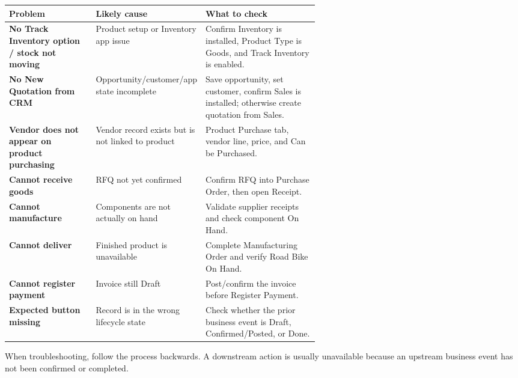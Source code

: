 \begin{erptable}
\begin{tabularx}{\linewidth}{@{}>{\bfseries\color{ERPRed}}p{0.29\linewidth}p{0.31\linewidth}X@{}}
\toprule
\rowcolor{ERPPaleRed!70}
Problem & Likely cause & What to check \\
\midrule
No Track Inventory option / stock not moving & Product setup or Inventory app issue & Confirm Inventory is installed, Product Type is Goods, and Track Inventory is enabled. \\
No New Quotation from CRM & Opportunity/customer/app state incomplete & Save opportunity, set customer, confirm Sales is installed; otherwise create quotation from Sales. \\
Vendor does not appear on product purchasing & Vendor record exists but is not linked to product & Product Purchase tab, vendor line, price, and Can be Purchased. \\
Cannot receive goods & RFQ not yet confirmed & Confirm RFQ into Purchase Order, then open Receipt. \\
Cannot manufacture & Components are not actually on hand & Validate supplier receipts and check component On Hand. \\
Cannot deliver & Finished product is unavailable & Complete Manufacturing Order and verify Road Bike On Hand. \\
Cannot register payment & Invoice still Draft & Post/confirm the invoice before Register Payment. \\
Expected button missing & Record is in the wrong lifecycle state & Check whether the prior business event is Draft, Confirmed/Posted, or Done. \\
\bottomrule
\end{tabularx}
\end{erptable}

\begin{keyidea}
When troubleshooting, follow the process backwards. A downstream action is usually unavailable because an upstream business event has not been confirmed or completed.
\end{keyidea}
